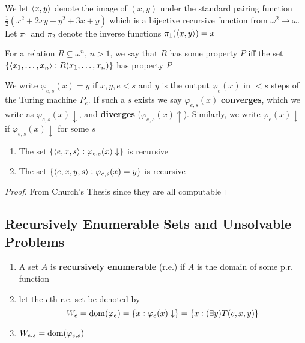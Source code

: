 \documentclass[11pt]{article}
\begin{document}
We let \(\langle x,y\rangle\) denote the image of \((x,y)\) under the standard pairing
function \(\frac{1}{2}(x^2+2xy+y^2+3x+y)\) which is a bijective recursive
function from \(\omega^2\to\omega\). Let \(\pi_1\) and \(\pi_2\) denote the inverse
functions \(\pi_1(\langle x,y\rangle)=x\)

For a relation \(R\subseteq\omega^n\), \(n>1\), we say that \(R\) has some
property \(P\) iff the set \(\{\langle x_1,\dots,x_n\rangle:R(x_1,\dots,x_n)\}\) has
property \(P\)

\begin{definition}[]
We write \(\varphi_{e,s}(x)=y\) if \(x,y,e<s\) and \(y\) is the output
\(\varphi_e(x)\) in \(<s\) steps of the Turing machine \(P_e\). If such a \(s\)
exists we say \(\varphi_{e,s}(x)\) \textbf{converges}, which we write as
\(\varphi_{e,s}(x)\downarrow\), and \textbf{diverges} (\(\varphi_{e,s}(x)\uparrow\)).
Similarly, we write \(\varphi_e(x)\downarrow\) if \(\varphi_{e,s}(x)\downarrow\)
for some \(s\)
\end{definition}

\begin{theorem}[]
\label{thm1.3.9}
\begin{enumerate}
\item The set \(\{\langle e,x,s\rangle:\varphi_{e,s}(x)\downarrow\}\) is recursive
\item The set \(\{\langle e,x,y,s\rangle:\varphi_{e,s}(x)=y\}\) is recursive
\end{enumerate}
\end{theorem}
\begin{proof}
From Church's Thesis since they are all computable
\end{proof}
\subsection{Recursively Enumerable Sets and Unsolvable Problems}
\label{sec:orgd67e998}
\begin{definition}[]
\begin{enumerate}
\item A set \(A\) is \textbf{recursively enumerable} (r.e.) if \(A\) is the domain of
some p.r. function
\item let the \(e\)th r.e. set be denoted by
\begin{equation*}
W_e=\operatorname{dom}(\varphi_e)=\{x:\varphi_e(x)\downarrow\}=\{x:(\exists y)T(e,x,y)\}
\end{equation*}
\item \(W_{e,s}=\operatorname{dom}(\varphi_{e,s})\)
\end{enumerate}
\end{definition}
\end{document}
